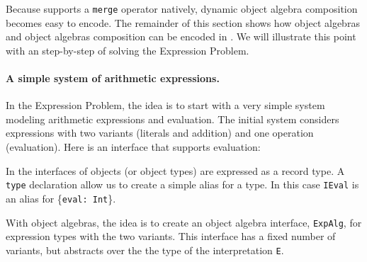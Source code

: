 Because \name supports a \lstinline{merge} operator natively, dynamic
object algebra composition becomes easy to encode. The remainder of
this section shows how object algebras and object algebras composition
can be encoded in \name. We will illustrate this point with an
step-by-step of solving the Expression Problem. 
 

\paragraph{A simple system of arithmetic expressions.} 
In the Expression Problem, the idea is to start with a very simple
system modeling arithmetic expressions and evaluation.
The initial system considers expressions with two variants (literals and
addition) and one operation (evaluation). Here is an interface that supports
evaluation:
\begin{comment}
  \begin{lstlisting}{language=F2J}
    type IEval = {eval: Int};
  \end{lstlisting}
\end{comment}

\noindent In \name the interfaces of objects (or object types) are expressed as
a record type. A \lstinline{type} declaration allow us to create a
simple alias for a type.  In this case \lstinline{IEval} is an alias
for \{\lstinline{eval: Int}\}.

With object algebras, the idea is to create an object algebra
interface, \lstinline$ExpAlg$, for expression types with the two
variants. This interface has a fixed number of variants, but abstracts over the
the type of the interpretation \lstinline$E$.

\begin{comment}
  \begin{lstlisting}{language=F2J}
    type ExpAlg[E] = {
      lit: Int -> E, 
      add: E -> E -> E
    };
  \end{lstlisting}
\end{comment}


